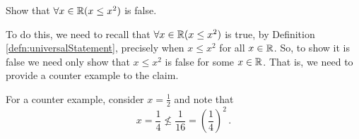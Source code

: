 \guard



\begin{exmp}
\label{exmp:univeralStatementOverRealsFalse}
	Show that $\forall x\in \mathbb{R}(x \leq x^2)$ is false.

	To do this, we need to recall that $\forall x\in \mathbb{R}(x \leq x^2)$ is true, by Definition \ref{defn:universalStatement}, precisely when $x\leq x^2$ for all $x\in \mathbb{R}$.
	So, to show it is false we need only show that $x \leq x^2$ is false for some $x\in\mathbb{R}$.
	That is, we need to provide a counter example to the claim.

	For a counter example, consider $x=\frac{1}{2}$ and note that \[ x=\frac{1}{4}\not\leq \frac{1}{16} = (\frac{1}{4})^2\,.\]
\end{exmp}

